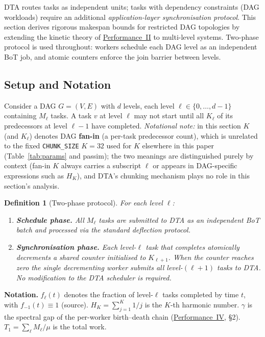 \documentclass[11pt,a4paper]{article}
\newtheorem{definition}{Definition}[section]
\newcommand{\code}[1]{\texttt{#1}}
\begin{document}
DTA routes tasks as independent units; tasks with dependency constraints
(DAG workloads) require an additional \emph{application-layer synchronisation
protocol}.  This section derives rigorous makespan bounds for restricted DAG
topologies by extending the kinetic theory of
\hyperref[chap:kinetic_theory]{Performance~II} to multi-level systems.
Two-phase protocol is used throughout: workers schedule each DAG level as
an independent BoT job, and atomic counters enforce the join barrier between
levels.

\subsection{Setup and Notation}

Consider a DAG $G=(V,E)$ with $d$ levels, each level $\ell \in \{0,\ldots,d-1\}$
containing $M_\ell$ tasks.  A task $v$ at level $\ell$ may not start until
all $K_\ell$ of its predecessors at level $\ell-1$ have completed.
\emph{Notational note:} in this section $K$ (and $K_\ell$) denotes DAG
\textbf{fan-in} (a per-task predecessor count), which is unrelated to
the fixed \code{CHUNK\_SIZE} $K=32$ used for $K$ elsewhere in this paper
(Table~\ref{tab:params} and passim); the two meanings are
distinguished purely by context (fan-in $K$ always carries a subscript
$\ell$ or appears in DAG-specific expressions such as $H_K$), and DTA's
chunking mechanism plays no role in this section's analysis.

\begin{definition}[Two-phase protocol]
\label{def:two_phase}
For each level $\ell$:
\begin{enumerate}
  \item \textbf{Schedule phase.} All $M_\ell$ tasks are submitted to DTA
        as an independent BoT batch and processed via the standard
        deflection protocol.
  \item \textbf{Synchronisation phase.} Each level-$\ell$ task that
        completes atomically decrements a shared counter initialised
        to $K_{\ell+1}$.  When the counter reaches zero the single
        decrementing worker submits all level-$(\ell{+}1)$ tasks to DTA.
        No modification to the DTA scheduler is required.
\end{enumerate}
\end{definition}

\textbf{Notation.}
$f_\ell(t)$ denotes the fraction of level-$\ell$ tasks completed by time $t$,
with $f_{-1}(t) \equiv 1$ (source).
$H_K = \sum_{j=1}^K 1/j$ is the $K$-th harmonic number.
$\gamma$ is the spectral gap of the per-worker birth--death chain
(\hyperref[chap:stability]{Performance~IV}, \S{}2).
$T_1 = \sum_\ell M_\ell/\mu$ is the total work.
\end{document}
